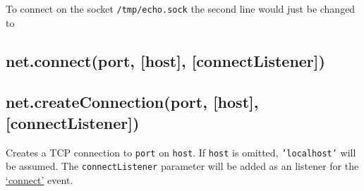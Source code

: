 \begin{Shaded}
\begin{Highlighting}[]
 \NormalTok{);}
 \NormalTok{(\{}\NormalTok{: }\NormalTok{\},}
    \NormalTok{() \{ }
  \NormalTok{(}\NormalTok{);}
  \NormalTok{(}\NormalTok{);}
\NormalTok{\});}
\NormalTok{(}\NormalTok{, }
  \NormalTok{(}\NormalTok{());}
  \NormalTok{();}
\NormalTok{\});}
\NormalTok{(}\NormalTok{, }\NormalTok{() \{}
  \NormalTok{(}\NormalTok{);}
\NormalTok{\});}
\end{Highlighting}
\end{Shaded}

To connect on the socket \texttt{/tmp/echo.sock} the second line would
just be changed to

\begin{Shaded}
\begin{Highlighting}[]
 \NormalTok{(\{}\NormalTok{: }\NormalTok{\},}
\end{Highlighting}
\end{Shaded}

\subsection{net.connect(port, {[}host{]}, {[}connectListener{]})}

\subsection{net.createConnection(port, {[}host{]},
{[}connectListener{]})}

Creates a TCP connection to \texttt{port} on \texttt{host}. If
\texttt{host} is omitted, \texttt{'localhost'} will be assumed. The
\texttt{connectListener} parameter will be added as an listener for the
\hyperref[net_event_connect]{`connect'} event.

